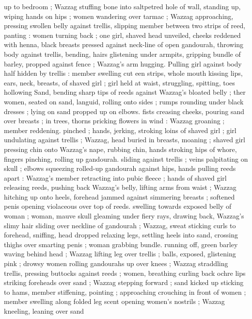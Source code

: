 up to bedroom ; Wazzag stuffing bone into saltpetred hole of wall, 
standing up, wiping hands on hips ; women wandering over tarmac ; 
Wazzag approaching, pressing swollen belly against trellis, slipping 
member between two strips of reed, panting : women turning back ; 
one girl, shaved head unveiled, cheeks reddened with henna, black 
breasts pressed against neck-line of open gandourah, throwing body 
against trellis, bending, hairs glistening under armpits, gripping 
bundle of barley, propped against fence ; Wazzag's arm hugging. 
Pulling girl against body half hidden by trellis : member swelling cut 
een strips, whole mouth kissing lips, ears, neck, breasts, of 
shaved girl ; girl held at waist, struggling, spitting, toes hollowing 
Sand, bending sharp tips of reeds against Wazzag's bloated belly ; 
ther women, seated on sand, languid, rolling onto sides ; rumps 
rounding under black dresses ; lying on sand propped up on elbows. 
fists creasing cheeks, pouring sand over breasts ; in trees, thorns 
pricking flowers in wind : Wazzag groaning ; member reddening. 
pinched ; hands, jerking, stroking loins of shaved girl ; girl 
undulating against trellis ; Wazzag, head buried in breasts, moaning 
; shaved girl pressing chin onto Wazzag's nape, rubbing chin, hands 
stroking hips of whore, fingers pinching, rolling up gandourah. 
sliding against trellis ; veins palpitating on skull ; elbows squeezing 
rolled-up gandourah against hips, hands pulling reeds apart : 
Wazzag's member retracting into pubic fleece ; hands of shaved girl 
releasing reeds, pushing back Wazzag's belly, lifting arms from waist 
; Wazzag hitching up onto heels, forehead jammed against simmering 
breasts ; softened penis opening violaceous over top of reeds. 
swelling towards exposed belly of woman ; woman, mauve skull 
gleaming under fiery rays, drawing back, Wazzag's slimy hair sliding 
over neckline of gandourah ; Wazzag, sweat sticking curls to 
forehead, sniffing, head dropped relaxing legs, settling heels into 
sand, crossing thighs over smarting penis ; woman grabbing bundle. 
running off, green barley waving behind head ; Wazzag lifting leg 
over trellis ; balls, exposed, glistening pink ; drowsy women rolling 
gandourahs up over knees ; Wazzag straddling trellis, pressing 
buttocks against reeds ; women, breathing curling back ochre lips 
striking foreheads over sand ; Wazzag stepping forward ; sand kicked 
up sticking to hams, member stiffening, pointing ; approaching 
crouching in front of women ; member swelling along folded leg 
scent opening women's nostrils ; Wazzag kneeling, leaning over sand 
